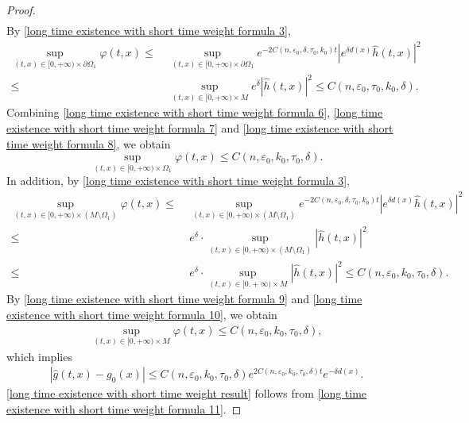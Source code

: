 \documentclass[12pt]{amsart}
\begin{document}
\begin{proof}
\begin{align}
    \end{align}
    By \eqref{long time existence with short time weight formula 3}, 
    \begin{equation}\label{long time existence with short time weight formula 8}
        \begin{split}
            \sup_{(t,x)\in [0, +\infty) \times \partial \Omega_1} \varphi(t, x) \leq&\; \sup_{(t, x)\in [0, +\infty) \times \partial \Omega_1} e^{-2C(n,\varepsilon_0, \delta,\tau_0, k_0)t}|e^{\delta d(x)}\hat{h}(t, x)|^2\\
            \leq&\; \sup_{(t, x)\in [0, +\infty)\times M}e^{\delta} |\hat{h}(t, x)|^2\leq C(n, \varepsilon_0, \tau_0, k_0, \delta).
        \end{split}
    \end{equation}
    Combining \eqref{long time existence with short time weight formula 6}, \eqref{long time existence with short time weight formula 7} and \eqref{long time existence with short time weight formula 8}, we obtain
    \begin{equation}\label{long time existence with short time weight formula 9}
        \sup_{(t, x)\in [0, +\infty) \times \Omega_1} \varphi(t, x) \leq C(n, \varepsilon_0, k_0, \tau_0, \delta). 
    \end{equation}
    In addition, by \eqref{long time existence with short time weight formula 3}, 
    \begin{equation}\label{long time existence with short time weight formula 10}
        \begin{split}
            \sup_{(t, x)\in [0, +\infty) \times (M\setminus \Omega_1)} \varphi(t, x) \leq&\; \sup_{(t, x)\in [0, +\infty) \times (M\setminus \Omega_1)} e^{-2C(n, \varepsilon_0, \delta, \tau_0, k_0)t}|e^{\delta d(x)}\hat{h}(t, x)|^2\\
            \leq&\; e^{\delta}\cdot \sup_{(t, x)\in [0, +\infty) \times (M\setminus \Omega_1)} |\hat{h}(t, x)|^2\\
            \leq&\; e^{\delta}\cdot \sup_{(t, x)\in [0. +\infty) \times M} |\hat{h}(t, x)|^2 \leq C(n, \varepsilon_0, k_0, \tau_0, \delta).
        \end{split}
    \end{equation}
    By \eqref{long time existence with short time weight formula 9} and \eqref{long time existence with short time weight formula 10}, we obtain
    \begin{align*}
        \sup_{(t, x)\in [0, +\infty) \times M}\varphi(t, x) \leq C(n,\varepsilon_0, k_0, \tau_0, \delta), 
    \end{align*} 
    which implies
    \begin{align}\label{long time existence with short time weight formula 11}
        |\hat{g}(t, x) - g_0(x)| \leq C(n,\varepsilon_0, k_0, \tau_0, \delta) e^{2 C(n,\varepsilon_0, k_0, \tau_0, \delta)t} e^{-\delta d(x)}.
    \end{align}
    \eqref{long time existence with short time weight result} follows from \eqref{long time existence with short time weight formula 11}. 
\end{proof}
\end{document}
